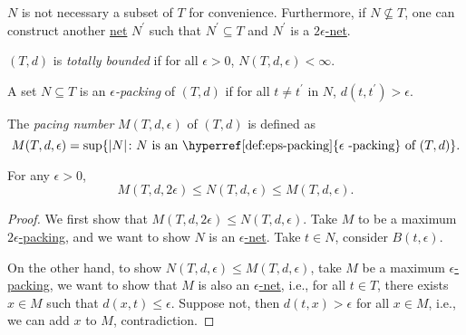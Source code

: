 \begin{remark}
  \(N\) is not necessary a subset of \(T\) for convenience. Furthermore, if \(N \nsubseteq T\), one can construct another \hyperref[def:eps-net]{net} \(N^{\prime} \) such that \(N^{\prime} \subseteq T\) and \(N^{\prime} \) is a \hyperref[def:eps-net]{\(2 \epsilon\)-net}.
\end{remark}

\begin{definition}\label{def:totally-bounded}
  \((T, d)\) is \emph{totally bounded} if for all \(\epsilon > 0\), \(N(T, d, \epsilon ) < \infty \).
\end{definition}

\begin{definition}\label{def:eps-packing}
  A set \(N \subseteq T\) is an \emph{\(\epsilon \)-packing} of \((T, d)\) if for all \(t \neq t^{\prime} \) in \(N\), \(d(t, t^{\prime} ) > \epsilon \).
\end{definition}

\begin{definition}\label{def:packing-number}
  The \emph{pacing number} \(M(T, d, \epsilon )\) of \((T, d)\) is defined as
  \[
    M(T, d, \epsilon ) = \sup \{ \vert N \vert \colon N \text{ is an \hyperref[def:eps-packing]{\(\epsilon\) -packing} of \((T, d)\)}\}.
  \]
\end{definition}

\begin{lemma}\label{lma:lec10}
  For any \(\epsilon > 0\),
  \[
    M(T, d, 2\epsilon ) \leq N(T, d, \epsilon ) \leq M(T, d, \epsilon ).
  \]
\end{lemma}
\begin{proof}
  We first show that \(M(T, d, 2\epsilon ) \leq N(T, d, \epsilon )\). Take \(M\) to be a maximum \hyperref[def:eps-packing]{\(2\epsilon\)-packing}, and we want to show \(N\) is an \hyperref[def:eps-net]{\(\epsilon\)-net}. Take \(t\in N\), consider \(B(t, \epsilon )\).

  On the other hand, to show \(N(T, d, \epsilon ) \leq M(T, d, \epsilon )\), take \(M\) be a maximum \hyperref[def:eps-packing]{\(\epsilon\)-packing}, we want to show that \(M\) is also an \hyperref[def:eps-net]{\(\epsilon\)-net}, i.e., for all \(t\in T\), there exists \(x\in M\) such that \(d(x, t) \leq \epsilon \). Suppose not, then \(d(t, x) > \epsilon \) for all \(x\in M\), i.e., we can add \(x\) to \(M\), contradiction.
\end{proof}

